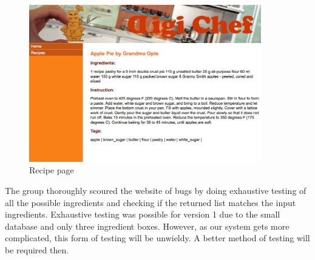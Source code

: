 \begin{figure}
\includegraphics[width=0.9\textwidth]{result_3}
\caption{Recipe page}
\label{fig:result_3}
\end{figure}

The group thoroughly scoured the website of bugs by doing exhaustive testing of all the possible ingredients and checking if the returned list matches the input ingredients. Exhaustive testing was possible for version 1 due to the small database and only three ingredient boxes. However, as our system gets more complicated, this form of testing will be unwieldy. A better method of testing will be required then.

